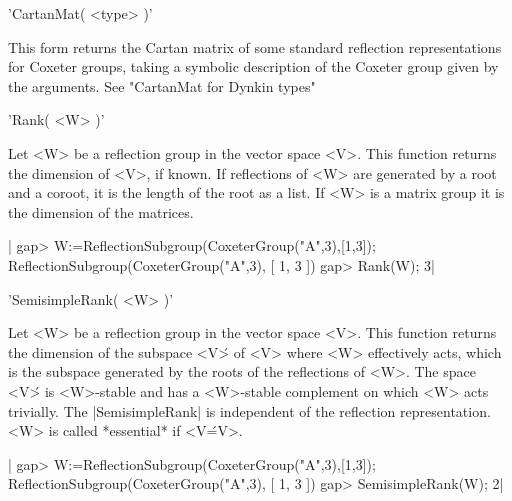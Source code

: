 'CartanMat( <type> )'

This   form  returns  the   Cartan  matrix  of   some  standard  reflection
representations  for Coxeter groups,  taking a symbolic  description of the
Coxeter group given by the arguments. See "CartanMat for Dynkin types"


'Rank( <W> )'

Let  <W>  be  a  reflection  group  in  the vector space <V>. This function
returns the dimension of <V>, if known. If reflections of <W> are generated
by a root and a coroot, it is the length of the root as a list. If <W> is a
matrix group it is the dimension of the matrices.

|    gap> W:=ReflectionSubgroup(CoxeterGroup("A",3),[1,3]);
    ReflectionSubgroup(CoxeterGroup("A",3), [ 1, 3 ])
    gap> Rank(W);
    3|


'SemisimpleRank( <W> )'

Let  <W>  be  a  reflection  group  in  the vector space <V>. This function
returns  the dimension of  the subspace <V\'>  of <V> where <W> effectively
acts,  which is the subspace  generated by the roots  of the reflections of
<W>. The space <V\'> is <W>-stable and has a <W>-stable complement on which
<W>  acts trivially. The |SemisimpleRank|  is independent of the reflection
representation. <W> is called *essential* if <V\'=V>.

|    gap> W:=ReflectionSubgroup(CoxeterGroup("A",3),[1,3]);
    ReflectionSubgroup(CoxeterGroup("A",3), [ 1, 3 ])
    gap> SemisimpleRank(W);                               
    2|

